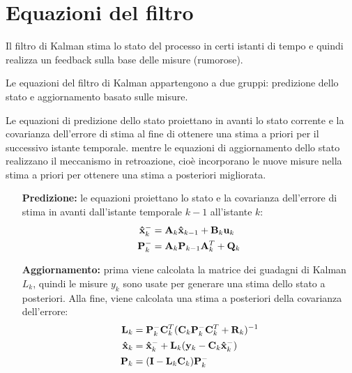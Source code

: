 \section{Equazioni del filtro}

Il filtro di Kalman stima lo stato del processo in certi istanti di tempo e quindi realizza un feedback sulla base delle misure (rumorose).

Le equazioni del filtro di Kalman appartengono a due gruppi:
predizione dello stato e aggiornamento basato sulle misure.

Le equazioni di predizione dello stato proiettano in avanti lo stato corrente e la covarianza dell’errore di stima al fine di ottenere una stima a priori per il successivo istante temporale.
mentre le equazioni di aggiornamento dello stato realizzano il meccanismo in retroazione, cioè incorporano le nuove misure nella stima a priori per ottenere una stima a posteriori migliorata.

\begin{itemize}
\item[\textbf{Predizione:}]le equazioni proiettano lo stato e la covarianza dell’errore di stima in avanti dall’istante temporale $k-1$ all’istante $k$:
\begin{align*}
\mathbf{\hat{x}}_k^- &= \mathbf{A}_k\mathbf{\hat{x}}_{k-1} + \mathbf{B}_k\mathbf{u}_k \\
\mathbf{P}_k^- &= \mathbf{A}_k\mathbf{P}_{k-1}\mathbf{A}_k^T + \mathbf{Q}_k
\end{align*}

\item[\textbf{Aggiornamento:}] prima viene calcolata la matrice dei guadagni di Kalman $L_k$, quindi le misure $y_k$ sono usate per generare una stima dello stato a posteriori. Alla fine, viene calcolata una stima a posteriori della covarianza dell’errore:
\begin{align*}
\mathbf{L}_k &= \mathbf{P}_k^-\mathbf{C}_k^T(\mathbf{C}_k\mathbf{P}_k^-\mathbf{C}_k^T + \mathbf{R}_k)^{-1}\\
\mathbf{\hat{x}}_k &= \mathbf{\hat{x}}_k^- + \mathbf{L}_k(\mathbf{y}_k - \mathbf{C}_k\mathbf{\hat{x}}_k^-)\\
\mathbf{P}_k &= (\mathbf{I} - \mathbf{L}_k\mathbf{C}_k)\mathbf{P}_k^-
\end{align*}

\end{itemize}
\newpage